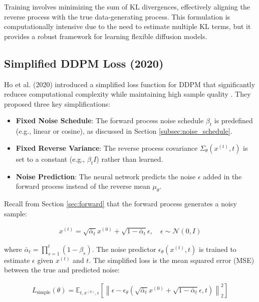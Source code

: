 \documentclass[12pt]{article}
\begin{document}
Training involves minimizing the sum of KL divergences, effectively aligning the reverse process with the true data-generating process. This formulation is computationally intensive due to the need to estimate multiple KL terms, but it provides a robust framework for learning flexible diffusion models.

\subsection{Simplified DDPM Loss (2020)}
\label{subsec:ddpm_loss}

Ho et al. (2020) introduced a simplified loss function for DDPM that significantly reduces computational complexity while maintaining high sample quality \cite{ho2020}. They proposed three key simplifications:
\begin{itemize}
    \item \textbf{Fixed Noise Schedule}: The forward process noise schedule \( \beta_t \) is predefined (e.g., linear or cosine), as discussed in Section \ref{subsec:noise_schedule}.
    \item \textbf{Fixed Reverse Variance}: The reverse process covariance \( \Sigma_\theta(x^{(t)}, t) \) is set to a constant (e.g., \( \beta_t I \)) rather than learned.
    \item \textbf{Noise Prediction}: The neural network predicts the noise \( \epsilon \) added in the forward process instead of the reverse mean \( \mu_\theta \).
\end{itemize}

Recall from Section \ref{sec:forward} that the forward process generates a noisy sample:

\begin{align}
x^{(t)} = \sqrt{\bar{\alpha}_t} x^{(0)} + \sqrt{1 - \bar{\alpha}_t} \epsilon, \quad \epsilon \sim \mathcal{N}(0, I)
\end{align}

where \( \bar{\alpha}_t = \prod_{s=1}^{t} (1 - \beta_s) \). The noise predictor \( \epsilon_\theta(x^{(t)}, t) \) is trained to estimate \( \epsilon \) given \( x^{(t)} \) and \( t \). The simplified loss is the mean squared error (MSE) between the true and predicted noise:

\begin{align}
L_{\text{simple}}(\theta) = \mathbb{E}_{t, x^{(0)}, \epsilon} \left[ \left\| \epsilon - \epsilon_\theta \left( \sqrt{\bar{\alpha}_t} x^{(0)} + \sqrt{1 - \bar{\alpha}_t} \epsilon, t \right) \right\|_2^2 \right]
\end{align}
\end{document}

